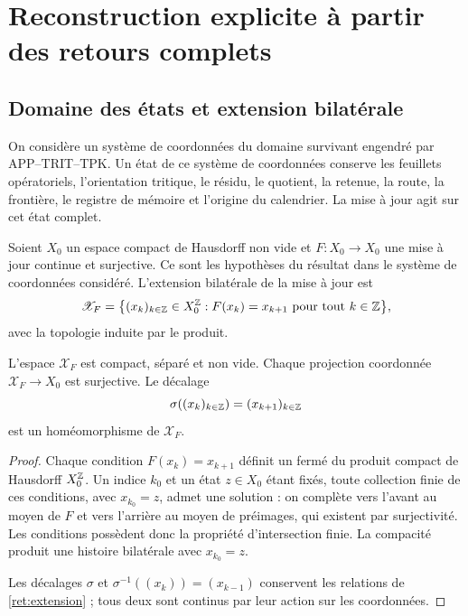 \section{Reconstruction explicite à partir des retours complets}
\label{ret:seccion}

\subsection{Domaine des états et extension bilatérale}

On considère un système de coordonnées du domaine survivant engendré par
APP--TRIT--TPK. Un état de ce système de coordonnées conserve les feuillets opératoriels,
l’orientation tritique, le résidu, le quotient, la retenue, la route,
la frontière, le registre de mémoire et l’origine du calendrier.
La mise à jour agit sur cet état complet.

Soient \(X_0\) un espace compact de Hausdorff non vide et
\(F:X_0\to X_0\) une mise à jour continue et surjective.
Ce sont les hypothèses du résultat dans le système de coordonnées considéré.
L’extension bilatérale de la mise à jour est
\begin{equation}
 \mathscr X_F=
 \bigl\{(x_k)_{k\in\mathbb Z}\in X_0^{\mathbb Z}:
                  F(x_k)=x_{k+1}\text{ pour tout }k\in\mathbb Z\bigr\},
 \label{ret:extension}
\end{equation}
avec la topologie induite par le produit.

\begin{lemma}
\label{ret:existencia}
L’espace \(\mathscr X_F\) est compact, séparé et non vide.
Chaque projection coordonnée \(\mathscr X_F\to X_0\) est surjective.
Le décalage
\[
 \sigma((x_k)_{k\in\mathbb Z})=(x_{k+1})_{k\in\mathbb Z}
\]
est un homéomorphisme de \(\mathscr X_F\).

\end{lemma}
\begin{proof}
Chaque condition \(F(x_k)=x_{k+1}\) définit un fermé du produit
compact de Hausdorff \(X_0^{\mathbb Z}\).
Un indice \(k_0\) et un état \(z\in X_0\) étant fixés, toute collection
finie de ces conditions, avec \(x_{k_0}=z\), admet une solution :
on complète vers l’avant au moyen de \(F\) et vers l’arrière au moyen de
préimages, qui existent par surjectivité. Les conditions possèdent
donc la propriété d’intersection finie. La compacité produit
une histoire bilatérale avec \(x_{k_0}=z\).

Les décalages \(\sigma\) et
\(\sigma^{-1}((x_k))=(x_{k-1})\) conservent les relations de
\eqref{ret:extension} ; tous deux sont continus par leur action sur les coordonnées.

\end{proof}

